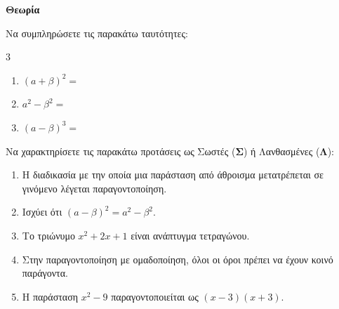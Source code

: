 \documentclass[11pt,a4paper,modern,B]{FFExam}
\begin{document}

\begin{thema}
\item \textbf{Θεωρία}
\begin{erwthma}
    \item Να συμπληρώσετε τις παρακάτω ταυτότητες: 
    \item \begin{multicols}{3}
    \begin{enumerate}[label=\alph*.]
        \item $(a+\beta)^2 = $ \vspace{2mm}
        \item $a^2-\beta^2 = $ \vspace{2mm}
        \item $(a-\beta)^3 = $ \vspace{2mm}
    \end{enumerate}
    \end{multicols}
    \item Να χαρακτηρίσετε τις παρακάτω προτάσεις ως Σωστές (\textbf{Σ}) ή Λανθασμένες (\textbf{Λ}): 
    \begin{enumerate}[label=\alph*.]
        \item Η διαδικασία με την οποία μια παράσταση από άθροισμα μετατρέπεται σε γινόμενο λέγεται παραγοντοποίηση.
        \item Ισχύει ότι $(a-\beta)^2 = a^2 - \beta^2$.
        \item Το τριώνυμο $x^2+2x+1$ είναι ανάπτυγμα τετραγώνου.
        \item Στην παραγοντοποίηση με ομαδοποίηση, όλοι οι όροι πρέπει να έχουν κοινό παράγοντα.
        \item Η παράσταση $x^2-9$ παραγοντοποιείται ως $(x-3)(x+3)$.
    \end{enumerate}
\end{erwthma}


\end{thema}
\end{document}

